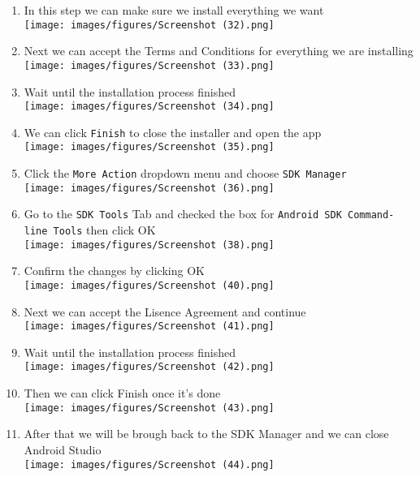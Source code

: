 \documentclass[12pt,titlepage]{article}
\begin{document}
\begin{enumerate}
    \newpage
    \item In this step we can make sure we install everything we want \\ \texttt{[image: images/figures/Screenshot (32).png]}
    \item Next we can accept the Terms and Conditions for everything we are installing \\ \texttt{[image: images/figures/Screenshot (33).png]}
    \newpage
    \item Wait until the installation process finished \\ \texttt{[image: images/figures/Screenshot (34).png]}
    \item We can click \texttt{Finish} to close the installer and open the app \\ \texttt{[image: images/figures/Screenshot (35).png]}
    \newpage
    \item Click the \texttt{More Action} dropdown menu and choose \texttt{SDK Manager} \\ \texttt{[image: images/figures/Screenshot (36).png]}
    \item Go to the \texttt{SDK Tools} Tab and checked the box for \texttt{Android SDK Command-line Tools} then click OK\\ \texttt{[image: images/figures/Screenshot (38).png]}
    \newpage
    \item Confirm the changes by clicking OK \\ \texttt{[image: images/figures/Screenshot (40).png]}
    \item Next we can accept the Lisence Agreement and continue \\ \texttt{[image: images/figures/Screenshot (41).png]}
    \newpage
    \item Wait until the installation process finished \\ \texttt{[image: images/figures/Screenshot (42).png]}
    \item Then we can click Finish once it's done \\ \texttt{[image: images/figures/Screenshot (43).png]}
    \newpage
    \item After that we will be brough back to the SDK Manager and we can close Android Studio \\ \texttt{[image: images/figures/Screenshot (44).png]}

\end{enumerate}
\end{document}
